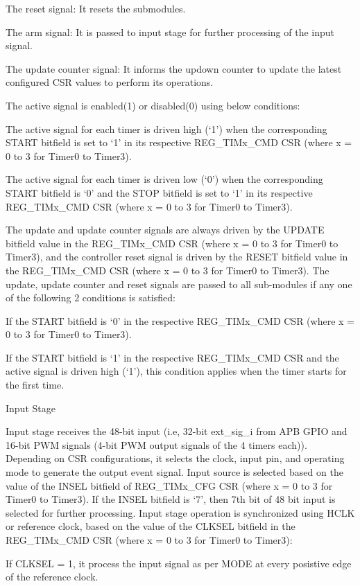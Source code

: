     The reset signal: It resets the submodules.

    The arm signal: It is passed to input stage for further processing of the input signal.

    The update counter signal: It informs the updown counter to update the latest configured CSR values to perform its operations.

The active signal is enabled(1) or disabled(0) using below conditions:

    The active signal for each timer is driven high (‘1’) when the corresponding START bitfield is set to ‘1’ in its respective REG_TIMx_CMD CSR (where x = 0 to 3 for Timer0 to Timer3).

    The active signal for each timer is driven low (‘0’) when the corresponding START bitfield is ‘0’ and the STOP bitfield is set to ‘1’ in its respective REG_TIMx_CMD CSR (where x = 0 to 3 for Timer0 to Timer3).

The update and update counter signals are always driven by the UPDATE bitfield value in the REG_TIMx_CMD CSR (where x = 0 to 3 for Timer0 to Timer3), and the controller reset signal is driven by the RESET bitfield value in the REG_TIMx_CMD CSR (where x = 0 to 3 for Timer0 to Timer3). The update, update counter and reset signals are passed to all sub-modules if any one of the following 2 conditions is satisfied:

    If the START bitfield is ‘0’ in the respective REG_TIMx_CMD CSR (where x = 0 to 3 for Timer0 to Timer3).

    If the START bitfield is ‘1’ in the respective REG_TIMx_CMD CSR and the active signal is driven high (‘1’), this condition applies when the timer starts for the first time.

Input Stage

Input stage receives the 48-bit input (i.e, 32-bit ext_sig_i from APB GPIO and 16-bit PWM signals (4-bit PWM output signals of the 4 timers each)). Depending on CSR configurations, it selects the clock, input pin, and operating mode to generate the output event signal. Input source is selected based on the value of the INSEL bitfield of REG_TIMx_CFG CSR (where x = 0 to 3 for Timer0 to Timer3). If the INSEL bitfield is ‘7’, then 7th bit of 48 bit input is selected for further processing. Input stage operation is synchronized using HCLK or reference clock, based on the value of the CLKSEL bitfield in the REG_TIMx_CMD CSR (where x = 0 to 3 for Timer0 to Timer3):

    If CLKSEL = 1, it process the input signal as per MODE at every posistive edge of the reference clock.

